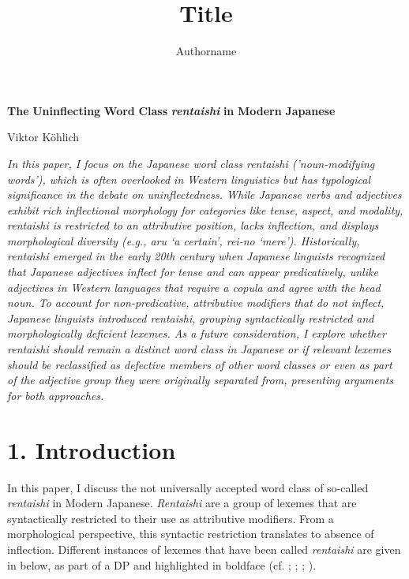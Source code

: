 \documentclass[output=paper]{langscibook}
\author{Authorname\orcid{}\affiliation{}}
\title{Title}
\begin{document}
\maketitle 


\textbf{The} \textbf{Uninflecting} \textbf{Word} \textbf{Class} \textbf{\textit{rentaishi}} \textbf{in} \textbf{Modern} \textbf{Japanese}

Viktor Köhlich

\textit{In this paper, I focus on the Japanese word class rentaishi ('noun-modifying words'), which is often overlooked in Western linguistics but has typological significance in the debate on uninflectedness. While Japanese verbs and adjectives exhibit rich inflectional morphology for categories like tense, aspect, and modality, rentaishi is restricted to an attributive position, lacks inflection, and displays morphological diversity (e.g., aru ‘a certain’, rei-no ‘mere’). Historically, rentaishi emerged in the early 20th century when Japanese linguists recognized that Japanese adjectives inflect for tense and can appear predicatively, unlike adjectives in Western languages that require a copula and agree with the head noun. To account for non-predicative, attributive modifiers that do not inflect, Japanese linguists introduced rentaishi, grouping syntactically restricted and morphologically deficient lexemes. As a future consideration, I explore whether rentaishi should remain a distinct word class in Japanese or if relevant lexemes should be reclassified as defective members of other word classes or even as part of the adjective group they were originally separated from, presenting arguments for both approaches.}

\section{1. Introduction}

In this paper, I discuss the not universally accepted word class of so-called \textit{rentaishi} in Modern Japanese. \textit{Rentaishi} are a group of lexemes that are syntactically restricted to their use as attributive modifiers. From a morphological perspective, this syntactic restriction translates to absence of inflection. Different instances of lexemes that have been called \textit{rentaishi} are given in  below, as part of a DP and highlighted in boldface (cf. \citealt{Sekine1937}; \citealt{Kai1980}; \citealt{Kim2006}; \citealt{Matsubara2009}).
\end{document}
